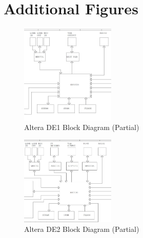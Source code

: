\documentclass[12pt]{article} %
\begin{document}
\section{Additional Figures} \label{sec:add}
\begin{figure}[h]
\centering
\includegraphics[width=0.4\textwidth]{./images/DE1_schem.jpg}
\caption{Altera DE1 Block Diagram (Partial)}
\label{fig:de1}    
\end{figure}
\begin{figure}[h]
\centering
\includegraphics[width=0.4\textwidth]{./images/DE2_schem.jpg}
\caption{Altera DE2 Block Diagram (Partial)}
\label{fig:de2}    
\end{figure}
\end{document}
